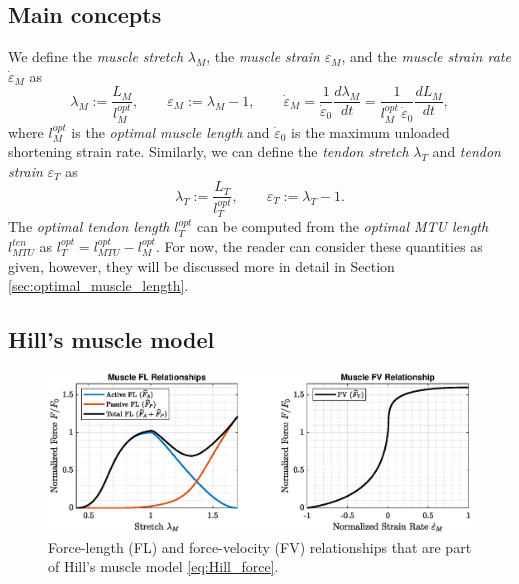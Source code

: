 \documentclass{sfuthesis}
\numberwithin{equation}{section}
\numberwithin{figure}{chapter}
\numberwithin{table}{chapter}
\theoremstyle{definition}
\newcommand{\der}[2]{\dfrac{d #1}{d #2}}
\newcommand{\depsilon}{\dot{\varepsilon}}
\begin{document}
\subsection{Main concepts}

We define the \textit{muscle stretch} $\lambda_M$, the \textit{muscle strain} $\varepsilon_M$, and the \textit{muscle strain rate} $\depsilon_M$ as
\begin{equation} \label{eq:def_stretch_strain_rate_muscle}
    \lambda_M := \dfrac{L_M}{l_M^{opt}}, \qquad \varepsilon_M := \lambda_M - 1, \qquad \depsilon_M = \dfrac{1}{\depsilon_0} \der{\lambda_M}{t} = \dfrac{1}{l_M^{opt} \, \depsilon_0} \der{L_M}{t},
\end{equation}
where $l_M^{opt}$ is the \textit{optimal muscle length} and $\depsilon_0$ is the maximum unloaded shortening strain rate. Similarly, we can define the \textit{tendon stretch} $\lambda_T$ and \textit{tendon strain} $\varepsilon_T$ as
\begin{equation}
    \lambda_T := \dfrac{L_T}{l_T^{opt}}, \qquad \varepsilon_T := \lambda_T - 1.
\end{equation} 
The \textit{optimal tendon length} $l_T^{opt}$ can be computed from the \textit{optimal MTU length} $l_{MTU}^{ten}$ as  $l_T^{opt} = l_{MTU}^{opt} - l_M^{opt}$. For now, the reader can consider these quantities as given, however, they will be discussed more in detail in Section \ref{sec:optimal_muscle_length}.

\subsection{Hill's muscle model}

\begin{figure}
    \centering
    \includegraphics[width=\textwidth]{plot_FL_FV.eps}
    \caption{Force-length (FL) and force-velocity (FV) relationships that are part of Hill's muscle model \eqref{eq:Hill_force}. \label{fig:plot_FL_FV}}
\end{figure}
\end{document}
